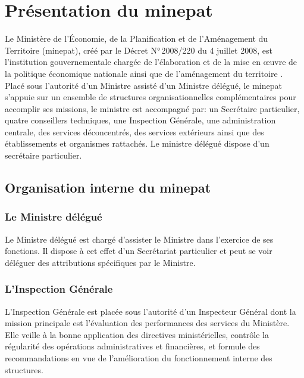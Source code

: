 \documentclass[12pt, a4paper, oneside]{report}
\begin{document}
\section[Présentation du MINEPAT]{Présentation du \gls{minepat}}
\label{sec:minepat}

Le Ministère de l'Économie, de la Planification et de l'Aménagement du Territoire
(\gls{minepat}), créé par le Décret N°\,2008/220 du 4 juillet 2008, est l'institution
gouvernementale chargée de l'élaboration et de la mise en \oe uvre de la politique
économique nationale ainsi que de l'aménagement du territoire \cite{decret2008}. Placé sous l'autorité
d'un Ministre assisté d'un Ministre délégué, le \gls{minepat} s'appuie sur un ensemble
de structures organisationnelles complémentaires pour accomplir ses missions, le ministre est accompagné par: un
Secrétaire particulier, quatre conseillers techniques, une Inspection Générale, une
administration centrale, des services déconcentrés, des services extérieurs ainsi que
des établissements et organismes rattachés. Le ministre délégué dispose d'un secrétaire particulier.

\subsection{Organisation interne du \gls{minepat}}

\subsubsection{Le Ministre délégué}

Le Ministre délégué est chargé d'assister le Ministre dans l'exercice de ses fonctions.
Il dispose à cet effet d'un Secrétariat particulier et peut se voir déléguer des
attributions spécifiques par le Ministre.

\subsubsection{L'Inspection Générale}

L'Inspection Générale est placée sous l'autorité d'un Inspecteur Général dont la
mission principale est l'évaluation des performances des services du Ministère. Elle
veille à la bonne application des directives ministérielles, contrôle la régularité des
opérations administratives et financières, et formule des recommandations en vue de
l'amélioration du fonctionnement interne des structures.
\end{document}
